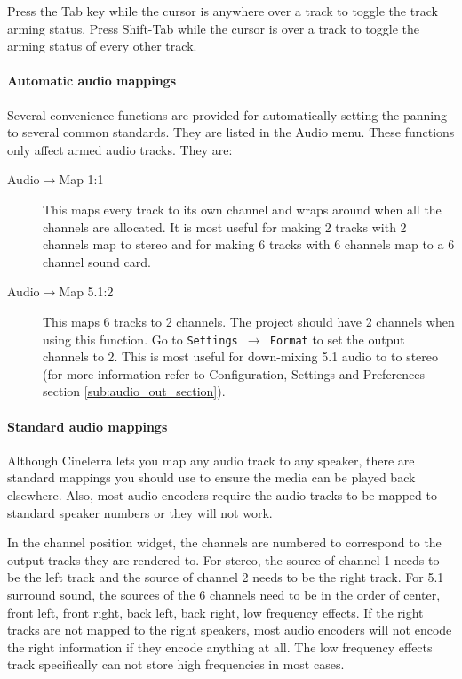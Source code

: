 Press the Tab key while the cursor is anywhere over a track to toggle the track arming status. Press Shift-Tab while the cursor is over a track to toggle the arming status of every other track.

\paragraph{Automatic audio mappings}
Several convenience functions are provided for automatically setting the panning to several common standards. They are listed in the Audio menu. These functions only affect armed audio tracks. They are:

    \begin{description}
        \item[Audio$\rightarrow$Map 1:1] This maps every track to its own channel and wraps around when all the channels are allocated. It is most useful for making 2 tracks with 2 channels map to stereo and for making 6 tracks with 6 channels map to a 6 channel sound card.
        \item[Audio$\rightarrow$Map 5.1:2] This maps 6 tracks to 2 channels. The project should have 2 channels when using this function. Go to \texttt{Settings $\rightarrow$ Format} to set the output channels to 2. This is most useful for down-mixing 5.1 audio to to stereo (for more information refer to Configuration, Settings and Preferences section \ref{sub:audio_out_section}).
    \end{description}

\paragraph{Standard audio mappings} Although Cinelerra lets you map any audio track to any speaker, there are standard mappings you should use to ensure the media can be played back elsewhere. Also, most audio encoders require the audio tracks to be mapped to standard speaker numbers or they will not work.

In the channel position widget, the channels are numbered to correspond to the output tracks they are rendered to. For stereo, the source of channel 1 needs to be the left track and the source of channel 2 needs to be the right track.  For 5.1 surround sound, the sources of the 6 channels need to be in the order of center, front left, front right, back left, back right, low frequency effects. If the right tracks are not mapped to the right speakers, most audio encoders will not encode the right information if they encode anything at all. The low frequency effects track specifically can not store high frequencies in
most cases.

